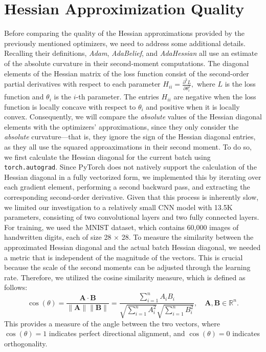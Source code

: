 \section{Hessian Approximization Quality}
Before comparing the quality of the Hessian approximations provided by the previously mentioned optimizers,
 we need to address some additional details.
Recalling their definitions, \emph{Adam}, \emph{AdaBelief}, and \emph{AdaHessian} all use an estimate of the
absolute curvature in their second-moment computations.
The diagonal elements of the Hessian matrix of the loss function consist of the second-order partial derivatives with respect to each parameter $H_{ii} = \frac{\partial^2 L}{\partial \theta_i^2},$
where \( L \) is the loss function and \( \theta_i \) is the \( i \)-th parameter.
The entries \( H_{ii} \) are negative when the loss function is locally concave with respect to \( \theta_i \) and positive when it is locally convex.
Consequently, we will compare the \emph{absolute} values of the Hessian diagonal elements with the optimizers' approximations,
 since they only consider the \emph{absolute} curvature—that is, they ignore the sign of the Hessian diagonal entries, 
 as they all use the squared approaximations in their second moment.
To do so, we first calculate the Hessian diagonal for the current batch using \texttt{torch.autograd}.
Since PyTorch does not natively support the calculation of the Hessian diagonal in a fully vectorized form,
we implemented this by iterating over each gradient element, performing a second backward pass, and extracting the corresponding second-order derivative.
Given that this process is inherently slow, we limited our investigation to a relatively small CNN model with 13.5K parameters, consisting of two convolutional layers and two fully connected layers.
For training, we used the MNIST dataset, which contains 60,000 images of handwritten digits, each of size 28 $\times$ 28.
To measure the similarity between the approximated Hessian diagonal and the actual batch Hessian diagonal, we needed a metric that is independent of the magnitude of the vectors.
This is crucial because the scale of the second moments can be adjusted through the learning rate.
Therefore, we utilized the cosine similarity measure, which is defined as follows:
\[
\cos(\theta) = \frac{\mathbf{A} \cdot \mathbf{B}}{\|\mathbf{A}\| \|\mathbf{B}\|} = \frac{\sum_{i=1}^{n} A_i B_i}{\sqrt{\sum_{i=1}^{n} A_i^2} \sqrt{\sum_{i=1}^{n} B_i^2}}, \quad \mathbf{A}, \mathbf{B} \in \mathbb{R}^n.
\]
This provides a measure of the angle between the two vectors, where \( \cos(\theta) = 1 \) indicates perfect directional alignment, and \( \cos(\theta) = 0 \) indicates orthogonality.
